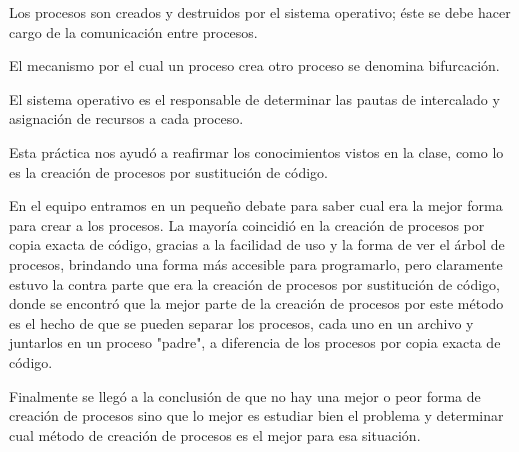 \documentclass[12pt]{article}
\begin{document}
        Los procesos son creados y destruidos por el sistema operativo; éste se debe hacer cargo de la comunicación entre procesos.
        
        El mecanismo por el cual un proceso crea otro proceso se denomina bifurcación.
        
        El sistema operativo es el responsable de determinar las pautas de intercalado y asignación de recursos a cada proceso.
        
        Esta práctica nos ayudó a reafirmar los conocimientos vistos en la clase, como lo es la creación de procesos por sustitución de código.
        
        En el equipo entramos en un pequeño debate para saber cual era la mejor forma para crear a los procesos. La mayoría coincidió en la creación de procesos por copia exacta de código, gracias a la facilidad de uso y la forma de ver el árbol de procesos, brindando una forma más accesible para programarlo, pero claramente estuvo la contra parte que era la creación de procesos por sustitución de código, donde se encontró que la mejor parte de la creación de procesos por este método es el hecho de que se pueden separar los procesos, cada uno en un archivo y juntarlos en un proceso "padre", a diferencia de los procesos por copia exacta de código. 
        
        Finalmente se llegó a la conclusión de que no hay una mejor o peor forma de creación de procesos sino que lo mejor es estudiar bien el problema y determinar cual método de creación de procesos es el mejor para esa situación.
        
        
\end{document}

